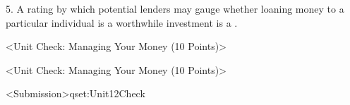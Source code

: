 \begin{naquestionfillintheblankwordbank}[individual=true]
	\label{qid.Unit12Check.5} 
	\begin{naqwordbank}[unique=true]
	\end{naqwordbank}

	\begin{naqfillintheblankwithwordbankpart}	
		\begin{naqinput}
			5. A rating by which potential lenders may gauge whether loaning money to a particular individual is a worthwhile investment is a .\\
		\end{naqinput}
		\begin{naqpaireditems}
		\end{naqpaireditems}
	\end{naqfillintheblankwithwordbankpart}
\end{naquestionfillintheblankwordbank}

\begin{naquestionset}<Unit Check: Managing Your Money (10 Points)>
	\label{qset:Unit12Check}
\end{naquestionset}

\begin{naassignment}[not_before_date=2014-01-28,not_after_date=2014-12-12,public=true,category=no_submit]<Unit Check: Managing Your Money (10 Points)>
    \label{assignment:Unit12Check}
    \begin{naassignmentpart}[auto_grade=true]<Submission>{qset:Unit12Check}
    \end{naassignmentpart}
\end{naassignment}

